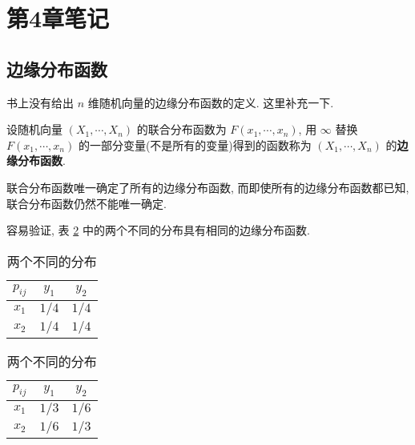 \documentclass{ctexart}
\begin{document}
\section{第4章笔记}
\subsection{边缘分布函数}
书上没有给出 $n$ 维随机向量的边缘分布函数的定义. 这里补充一下.
\begin{definition}
    设随机向量 $(X_1,\cdots,X_n)$ 的联合分布函数为 $F(x_1,\cdots,x_n)$, 用 $\infty$ 替换 $F(x_1,\cdots,x_n)$ 的一部分变量(不是所有的变量)得到的函数称为 $(X_1,\cdots,X_n)$ 的\textbf{边缘分布函数}.
\end{definition}

联合分布函数唯一确定了所有的边缘分布函数, 而即使所有的边缘分布函数都已知, 联合分布函数仍然不能唯一确定.
\begin{example}
    容易验证, 表 \ref{tb1} 中的两个不同的分布具有相同的边缘分布函数.
    \begin{table}[htbp!]
        \centering
        \begin{tabular}{c|cc}
            $p_{ij}$ & $y_1$ & $y_2$ \\
            \hline
            $x_1$    & $1/4$ & $1/4$ \\
            $x_2$    & $1/4$ & $1/4$ \\
        \end{tabular}\quad\quad
        \begin{tabular}{c|cc}
            $p_{ij}$ & $y_1$ & $y_2$ \\
            \hline
            $x_1$    & $1/3$ & $1/6$ \\
            $x_2$    & $1/6$ & $1/3$ \\
        \end{tabular}
        \caption{两个不同的分布}\label{tb1}
    \end{table}
\end{example}
\end{document}
